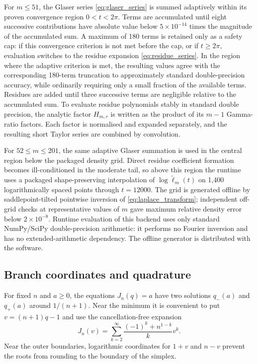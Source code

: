 \documentclass[11pt]{article}
\theoremstyle{remark}
\begin{document}
For $m\le51$, the Glaser series \eqref{eq:glaser_series} is summed adaptively within its proven convergence region $0<t<2\pi$. Terms are accumulated until eight successive contributions have absolute value below $5\times10^{-14}$ times the magnitude of the accumulated sum. A maximum of 180 terms is retained only as a safety cap: if this convergence criterion is not met before the cap, or if $t\ge2\pi$, evaluation switches to the residue expansion \eqref{eq:residue_series}. In the region where the adaptive criterion is met, the resulting values agree with the corresponding 180-term truncation to approximately standard double-precision accuracy, while ordinarily requiring only a small fraction of the available terms. Residues are added until three successive terms are negligible relative to the accumulated sum. To evaluate residue polynomials stably in standard double precision, the analytic factor $H_{m,r}$ is written as the product of its $m-1$ Gamma-ratio factors. Each factor is normalised and expanded separately, and the resulting short Taylor series are combined by convolution.

For $52\le m\le201$, the same adaptive Glaser summation is used in the central region below the packaged density grid. Direct residue coefficient formation becomes ill-conditioned in the moderate tail, so above this region the runtime uses a packaged shape-preserving interpolation of $\log\widetilde\ell_m(t)$ on 1,400 logarithmically spaced points through $t=12000$. The grid is generated offline by saddlepoint-tilted pointwise inversion of \eqref{eq:laplace_transform}; independent off-grid checks at representative values of $m$ gave maximum relative density error below $2\times10^{-8}$. Runtime evaluation of this backend uses only standard NumPy/SciPy double-precision arithmetic: it performs no Fourier inversion and has no extended-arithmetic dependency. The offline generator is distributed with the software.

\subsection{Branch coordinates and quadrature}

For fixed $n$ and $a\ge0$, the equations $J_n(q)=a$ have two solutions $q_-(a)$ and $q_+(a)$ around $1/(n+1)$. Near the minimum it is convenient to put $v=(n+1)q-1$ and use the cancellation-free expansion
\begin{equation}
 J_n(v)=\sum_{k=2}^{\infty}
 \frac{(-1)^k+n^{1-k}}{k}v^k.
 \label{eq:J_v_series}
\end{equation}
Near the outer boundaries, logarithmic coordinates for $1+v$ and $n-v$ prevent the roots from rounding to the boundary of the simplex.
\end{document}

